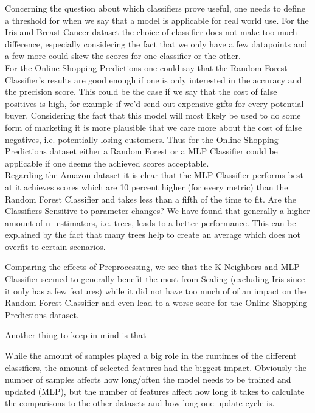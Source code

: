 Concerning the question about which classifiers prove useful, one needs to define a threshold for when we say that a model is applicable for real world use. For the Iris and Breast Cancer dataset the choice of classifier does not make too much difference, especially considering the fact that we only have a few datapoints and a few more could skew the scores for one classifier or the other. \\
For the Online Shopping Predictions one could say that the Random Forest Classifier's results are good enough if one is only interested in the accuracy and the precision score. This could be the case if we say that the cost of false positives is high, for example if we'd send out expensive gifts for every potential buyer. Considering the fact that this model will most likely be used to do some form of marketing it is more plausible that we care more about the cost of false negatives, i.e. potentially losing customers. Thus for the Online Shopping Predictions dataset either a Random Forest or a MLP Classifier could be applicable if one deems the achieved scores acceptable. \\
Regarding the Amazon dataset it is clear that the MLP Classifier performs best at it achieves scores which are 10 percent higher (for every metric) than the Random Forest Classifier and takes less than a fifth of the time to fit.
\newline
Are the Classifiers Sensitive to parameter changes? 
We have found that generally a higher amount of n\_estimators, i.e. trees, leads to a better performance. This can be explained by the fact that many trees help to create an average which does not overfit to certain scenarios.


Comparing the effects of Preprocessing, we see that the K Neighbors and MLP Classifier seemed to generally benefit the most from Scaling (excluding Iris since it only has a few features) while it did not have too much of of an impact on the Random Forest Classifier and even lead to a worse score for the Online Shopping Predictions dataset.

Another thing to keep in mind is that 

While the amount of samples played a big role in the runtimes of the different classifiers, the amount of selected features had the biggest impact. Obviously the number of samples affects how long/often the model needs to be trained and updated (MLP), but the number of features affect how long it takes to calculate the comparisons to the other datasets and how long one update cycle is.

